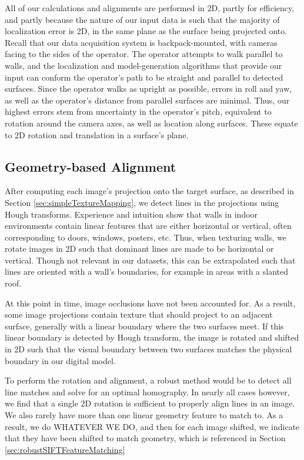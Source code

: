 \documentclass[]{spie}  %
\begin{document}
All of our calculations and alignments are performed in 2D, partly for
efficiency, and partly because the nature of our input data is such
that the majority of localization error is 2D, in the same plane as
the surface being projected onto. Recall that our data acquisition
system is backpack-mounted, with cameras facing to the sides of the
operator. The operator attempts to walk parallel to walls, and the
localization and model-generation algorithms that provide our input
can conform the operator's path to be straight and parallel to
detected surfaces. Since the operator walks as upright as possible,
errors in roll and yaw, as well as the operator's distance from
parallel surfaces are minimal. Thus, our highest errors stem from
uncertainty in the operator's pitch, equivalent to rotation around the
camera axes, as well as location along surfaces. These equate to 2D
rotation and translation in a surface's plane.

\subsection{Geometry-based Alignment}
\label{sec:geometryAlignment}
After computing each image's projection onto the target surface, as
described in Section \ref{sec:simpleTextureMapping}, we detect lines
in the projections using Hough transforms. Experience and intuition
show that walls in indoor environments contain linear features that
are either horizontal or vertical, often corresponding to doors,
windows, posters, etc. Thus, when texturing walls, we rotate images in
2D such that dominant lines are made to be horizontal or
vertical. Though not relevant in our datasets, this can be
extrapolated such that lines are oriented with a wall's boundaries,
for example in areas with a slanted roof.

At this point in time, image occlusions have not been accounted
for. As a result, some image projections contain texture that should
project to an adjacent surface, generally with a linear boundary where
the two surfaces meet. If this linear boundary is detected by Hough
transform, the image is rotated and shifted in 2D such that the visual
boundary between two surfaces matches the physical boundary in our
digital model.

To perform the rotation and alignment, a robust method would be to
detect all line matches and solve for an optimal homography. In nearly
all cases however, we find that a single 2D rotation is sufficient to
properly align lines in an image. We also rarely have more than one
linear geometry feature to match to. As a result, we do WHATEVER WE DO, and then for each image shifted, we indicate that they have been shifted to match geometry, which is referenced in Section \ref{sec:robustSIFTFeatureMatching}
\end{document}

